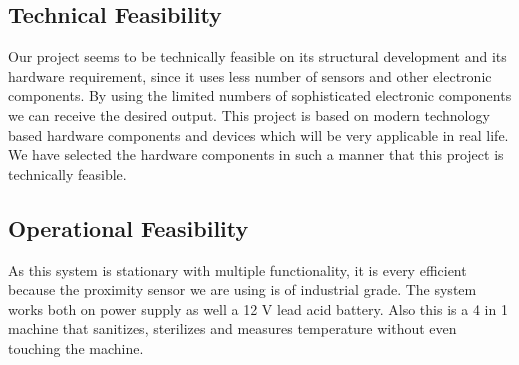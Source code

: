 \documentclass[a4paper,12pt]{report}
\begin{document}
\subsection{Technical Feasibility}
Our project seems to be technically feasible on its structural development and its hardware
requirement, since it uses less number of sensors and other electronic components. By using
the limited numbers of sophisticated electronic components we can receive the desired output.
This project is based on modern technology based hardware components and devices which
will be very applicable in real life. We have selected the hardware components in such a
manner that this project is technically feasible.
\subsection{Operational Feasibility}
As this system is stationary with multiple functionality, it is every efficient because the
proximity sensor we are using is of industrial grade. The system works both on power supply
as well a 12 V lead acid battery. Also
this is a 4 in 1 machine that sanitizes, sterilizes and measures temperature
without even touching the machine.
\end{document}
